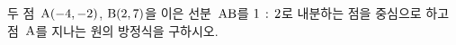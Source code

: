 두 점~$\mathrm{A}(-4{,}\mkern3mu\mathopen{}-2)$, $\mathrm{B}(2{,}\mkern3mu\mathopen{}7)$을 이은 선분~$\mathrm{AB}$를 $1\mkern3mu :\mkern3mu 2$로 내분하는 점을 중심으로 하고 점~$\mathrm{A}$를 지나는 원의 방정식을 구하시오.

